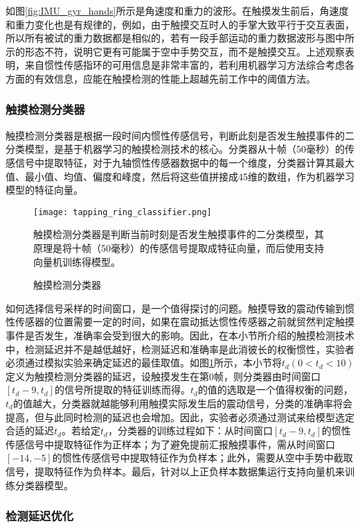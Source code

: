 如图\ref{fig:IMU_gyr_hands}所示是角速度和重力的波形。在触摸发生前后，角速度和重力变化也是有规律的，例如，由于触摸交互时人的手掌大致平行于交互表面，所以所有被试的重力数据都是相似的，若有一段手部运动的重力数据波形与图中所示的形态不符，说明它更有可能属于空中手势交互，而不是触摸交互。上述观察表明，来自惯性传感指环的可用信息是非常丰富的，若利用机器学习方法综合考虑各方面的有效信息，应能在触摸检测的性能上超越先前工作中的阈值方法\cite{lam2002mids, oh2017anywheretouch, niikura2014anywhere}。

\subsubsection{触摸检测分类器}

触摸检测分类器是根据一段时间内惯性传感信号，判断此刻是否发生触摸事件的二分类模型，是基于机器学习的触摸检测技术的核心。分类器从十帧（50毫秒）的传感信号中提取特征，对于九轴惯性传感器数据中的每一个维度，分类器计算其最大值、最小值、均值、偏度和峰度，然后将这些值拼接成45维的数组，作为机器学习模型的特征向量。

\begin{figure}
	\centering
	\texttt{[image: tapping\_ring\_classifier.png]}
	\caption*{触摸检测分类器是判断当前时刻是否发生触摸事件的二分类模型，其原理是将十帧（50毫秒）的传感信号提取成特征向量，而后使用支持向量机训练得模型。}
	\caption{触摸检测分类器}
	\label{fig:tapping_ring_classifier}
\end{figure}

如何选择信号采样的时间窗口，是一个值得探讨的问题。触摸导致的震动传输到惯性传感器的位置需要一定的时间，如果在震动抵达惯性传感器之前就贸然判定触摸事件是否发生，准确率会受到很大的影响。因此，在本小节所介绍的触摸检测技术中，检测延迟并不是越低越好，检测延迟和准确率是此消彼长的权衡惯性，实验者必须通过模拟实验来确定延迟的最佳取值。如图\ref{fig:tapping_ring_classifier}所示，本小节将$t_d(0<t_d<10)$定义为触摸检测分类器的延迟，设触摸发生在第0帧，则分类器由时间窗口$[t_d-9,t_d]$的信号所提取的特征训练而得。$t_d$的值的选取是一个值得权衡的问题，$t_d$的值越大，分类器就越能够利用触摸实际发生后的震动信号，分类的准确率将会提高，但与此同时检测的延迟也会增加。因此，实验者必须通过测试来给模型选定合适的延迟$t_d$。若给定$t_d$，分类器的训练过程如下：从时间窗口$[t_d-9,t_d]$的惯性传感信号中提取特征作为正样本；为了避免提前汇报触摸事件，需从时间窗口$[-14,-5]$的惯性传感信号中提取特征作为负样本；此外，需要从空中手势中截取信号，提取特征作为负样本。最后，针对以上正负样本数据集运行支持向量机来训练分类器模型。

\subsubsection{检测延迟优化}

